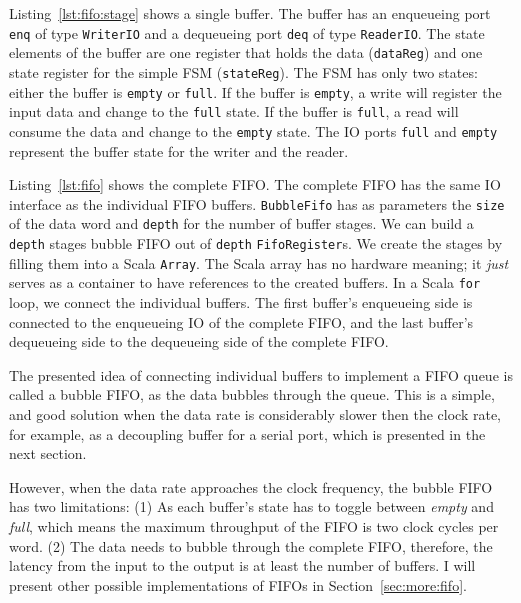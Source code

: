 \documentclass[%
    10pt,
    headinclude, footexclude,
    openright, %
    notitlepage,
    cleardoubleempty,
    headsepline,
    pointlessnumbers,
    bibtotoc, idxtotoc,
    ]{scrbook}
\newcommand{\code}[1]{{\lstinline[basicstyle=\small\ttfamily]{#1}}}
\begin{document}

Listing~\ref{lst:fifo:stage} shows a single buffer. The buffer has an enqueueing port
\code{enq} of type \code{WriterIO} and a dequeueing port \code{deq} of type
\code{ReaderIO}. The state elements of the buffer are one register that holds the
data (\code{dataReg}) and one state register for the simple FSM (\code{stateReg}).
The FSM has only two states: either the buffer is \code{empty} or \code{full}.
If the buffer is \code{empty}, a write will register the input data and change
to the \code{full} state.
If the buffer is \code{full}, a read will consume the data and change to the
\code{empty} state.
The IO ports \code{full} and \code{empty} represent the buffer state for
the writer and the reader.


Listing~\ref{lst:fifo} shows the complete FIFO. The complete FIFO has
the same IO interface as the individual FIFO buffers.
\code{BubbleFifo} has as parameters the \code{size} of the data
word and \code{depth} for the number of buffer stages.
We can build a \code{depth} stages bubble FIFO out of \code{depth}
\code{FifoRegister}s. We create the stages by filling them into a Scala \code{Array}.
The Scala array has no hardware meaning; it \emph{just} serves as
a container to have references to the created buffers.
In a Scala \code{for} loop, we connect the individual buffers.
The first buffer's enqueueing side is connected to the enqueueing IO of
the complete FIFO, and the last buffer's dequeueing side to the
dequeueing side of the complete FIFO.


The presented idea of connecting individual buffers to implement a FIFO
queue is called a bubble FIFO, as the data bubbles through the queue.
This is a simple, and good solution when the data rate is considerably slower
then the clock rate, for example, as a decoupling buffer for a serial port, which is presented
in the next section.

However, when the data rate approaches the clock frequency, the bubble FIFO
has two limitations: (1) As each buffer's state has to toggle between \emph{empty} and
\emph{full}, which means the maximum throughput of the FIFO is two clock cycles
per word. (2) The data needs to bubble through the complete FIFO, therefore,
the latency from the input to the output is at least the number of buffers.
I will present other possible implementations of FIFOs in Section~\ref{sec:more:fifo}.
\end{document}
